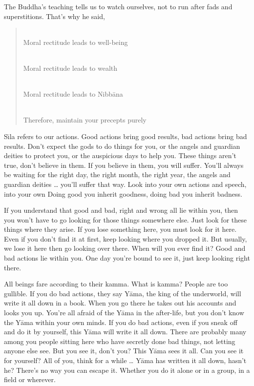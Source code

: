The Buddha's teaching tells us to watch ourselves, not to run after fads and superstitions. That's why he said,

\begin{verse}
\\
Moral rectitude leads to well-being

\\
Moral rectitude leads to wealth

\\
Moral rectitude leads to Nibb\=ana

\\
Therefore, maintain your precepts purely
\end{verse}

S\={\i}la refers to our actions. Good actions bring good results, bad actions bring bad results. Don't expect the gods to do things for you, or the angels and guardian deities to protect you, or the auspicious days to help you. These things aren't true, don't believe in them. If you believe in them, you will suffer. You'll always be waiting for the right day, the right month, the right year, the angels and guardian deities \ldots{} you'll suffer that way. Look into your own actions and speech, into your own  Doing good you inherit goodness, doing bad you inherit badness. 

If you understand that good and bad, right and wrong all lie within you, then you won't have to go looking for those things somewhere else. Just look for these things where they arise. If you lose something here, you must look for it here. Even if you don't find it at first, keep looking where you dropped it. But usually, we lose it here then go looking over there. When will you ever find it? Good and bad actions lie within you. One day you're bound to see it, just keep looking right there. 

All beings fare according to their kamma. What is kamma? People are too gullible. If you do bad actions, they say Y\=ama, the king of the underworld, will write it all down in a book. When you go there he takes out his accounts and looks you up. You're all afraid of the Y\=ama in the after-life, but you don't know the Y\=ama within your own minds. If you do bad actions, even if you sneak off and do it by yourself, this Y\=ama will write it all down. There are probably many among you people sitting here who have secretly done bad things, not letting anyone else see. But you see it, don't you? This Y\=ama sees it all. Can you see it for yourself? All of you, think for a while \ldots{} Y\=ama has written it all down, hasn't he? There's no way you can escape it. Whether you do it alone or in a group, in a field or wherever.

